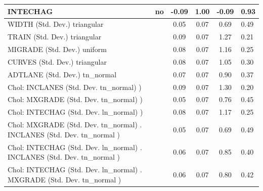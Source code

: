 \begin{table}
\begin{center}
\begin{tabular}{|l|l|c|c|c|l|}
			INTECHAG & no & -0.09 & 1.00 & -0.09 & 0.93 \\
			\hline
			WIDTH (Std. Dev.) triangular &  & 0.05 & 0.07 & 0.69 & 0.49 \\
			\hline
			TRAIN (Std. Dev.) triangular &  & 0.09 & 0.07 & 1.27 & 0.21 \\
			\hline
			MIGRADE (Std. Dev.) uniform &  & 0.08 & 0.07 & 1.16 & 0.25 \\
			\hline
			CURVES (Std. Dev.) triangular &  & 0.08 & 0.07 & 1.05 & 0.30 \\
			\hline
			ADTLANE (Std. Dev.) tn_normal &  & 0.07 & 0.07 & 0.90 & 0.37 \\
			\hline
			 Chol: INCLANES (Std. Dev. tn_normal) ) &  & 0.09 & 0.07 & 1.30 & 0.20 \\
			\hline
			 Chol: MXGRADE (Std. Dev. tn_normal) ) &  & 0.05 & 0.07 & 0.76 & 0.45 \\
			\hline
			 Chol: INTECHAG (Std. Dev. ln_normal) ) &  & 0.08 & 0.07 & 1.17 & 0.25 \\
			\hline
			 Chol: MXGRADE (Std. Dev. tn_normal) . INCLANES (Std. Dev.   tn_normal ) &  & 0.05 & 0.07 & 0.69 & 0.49 \\
			\hline
			 Chol: INTECHAG (Std. Dev. ln_normal) . INCLANES (Std. Dev.   tn_normal ) &  & 0.06 & 0.07 & 0.85 & 0.40 \\
			\hline
			 Chol: INTECHAG (Std. Dev. ln_normal) . MXGRADE (Std. Dev.   tn_normal ) &  & 0.06 & 0.07 & 0.80 & 0.42 \\
			\hline
		\end{tabular}
	\end{center}
\end{table}